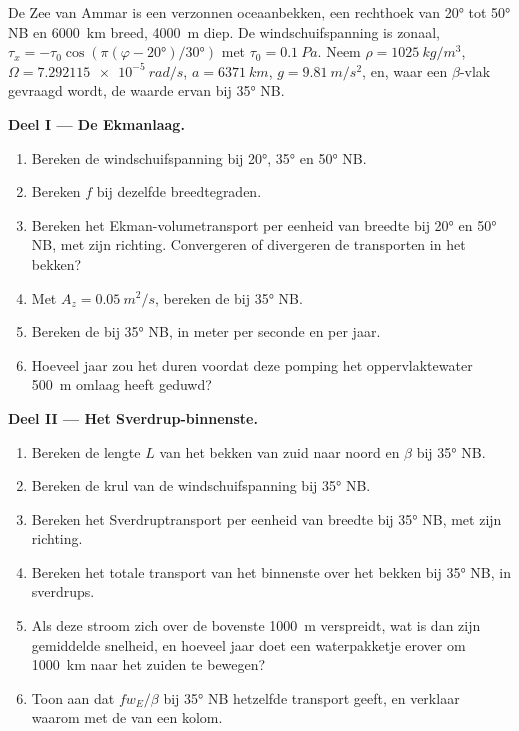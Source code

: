 \begin{problem}
\label{pb:b3:ocean-dynamics:1}
De Zee van Ammar is een verzonnen oceaanbekken, een rechthoek van \ang{20} tot
\ang{50} NB en \qty{6000}{km} breed, \qty{4000}{m} diep. De windschuifspanning is
zonaal, $\tau_x = -\tau_0\cos(\pi(\varphi - \ang{20})/\ang{30})$ met $\tau_0
= \qty{0.1}{Pa}$. Neem $\rho = \qty{1025}{kg/m^3}$, $\Omega =
\qty{7.292115e-5}{rad/s}$, $a = \qty{6371}{km}$, $g = \qty{9.81}{m/s^2}$,
en, waar een $\beta$-vlak gevraagd wordt, de waarde ervan bij \ang{35} NB.

\medskip\noindent\textbf{Deel I --- De Ekmanlaag.}
\begin{enumerate}
\item Bereken de windschuifspanning bij \ang{20}, \ang{35} en \ang{50} NB.
\item Bereken $f$ bij dezelfde breedtegraden.
\item Bereken het Ekman-volumetransport per eenheid van breedte bij \ang{20} en
  \ang{50} NB, met zijn richting. Convergeren of divergeren de transporten in
  het bekken?
\item Met $A_z = \qty{0.05}{m^2/s}$, bereken de  bij \ang{35} NB.
\item Bereken de  bij \ang{35} NB, in meter per seconde en per
  jaar.
\item Hoeveel jaar zou het duren voordat deze pomping het oppervlaktewater
  \qty{500}{m} omlaag heeft geduwd?
\end{enumerate}

\medskip\noindent\textbf{Deel II --- Het Sverdrup-binnenste.}
\begin{enumerate}[resume]
\item Bereken de lengte $L$ van het bekken van zuid naar noord en $\beta$ bij
  \ang{35} NB.
\item Bereken de krul van de windschuifspanning bij \ang{35} NB.
\item Bereken het Sverdruptransport per eenheid van breedte bij \ang{35} NB, met
  zijn richting.
\item Bereken het totale transport van het binnenste over het bekken bij
  \ang{35} NB, in sverdrups.
\item Als deze stroom zich over de bovenste \qty{1000}{m} verspreidt, wat is
  dan zijn gemiddelde snelheid, en hoeveel jaar doet een waterpakketje erover om
  \qty{1000}{km} naar het zuiden te bewegen?
\item Toon aan dat $fw_E/\beta$ bij \ang{35} NB hetzelfde transport geeft, en
  verklaar waarom met de  van een kolom.
\end{enumerate}


\end{problem}

